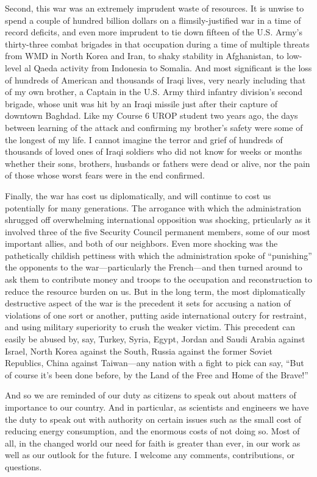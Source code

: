 \documentclass{report}
\begin{document}
Second, this war was an extremely imprudent waste of resources.  It is unwise
to spend a couple of hundred billion dollars on a flimsily-justified war in a
time of record deficits, and even more imprudent to tie down fifteen of the
U.S. Army's thirty-three combat brigades in that occupation during a time of
multiple threats from WMD in North Korea and Iran, to shaky stability in
Afghanistan, to low-level al Qaeda activity from Indonesia to Somalia.  And
most significant is the loss of hundreds of American and thousands of Iraqi
lives, very nearly including that of my own brother, a Captain in the U.S.
Army third infantry division's second brigade, whose unit was hit by an Iraqi
missile just after their capture of downtown Baghdad.  Like my Course 6 UROP
student two years ago, the days between learning of the attack and confirming
my brother's safety were some of the longest of my life.  I cannot imagine the
terror and grief of hundreds of thousands of loved ones of Iraqi soldiers who
did not know for weeks or months whether their sons, brothers, husbands or
fathers were dead or alive, nor the pain of those whose worst fears were in the
end confirmed.

Finally, the war has cost us diplomatically, and will continue to cost us
potentially for many generations.  The arrogance with which the administration
shrugged off overwhelming international opposition was shocking, prticularly as
it involved three of the five Security Council permanent members, some of our
most important allies, and both of our neighbors.  Even more shocking was the
pathetically childish pettiness with which the administration spoke of
``punishing'' the opponents to the war---particularly the French---and then
turned around to ask them to contribute money and troops to the occupation and
reconstruction to reduce the resource burden on us.  But in the long term, the
most diplomatically destructive aspect of the war is the precedent it sets for
accusing a nation of violations of one sort or another, putting aside
international outcry for restraint, and using military superiority to crush the
weaker victim.  This precedent can easily be abused by, say, Turkey, Syria,
Egypt, Jordan and Saudi Arabia against Israel, North Korea against the South,
Russia against the former Soviet Republics, China against Taiwan---any nation
with a fight to pick can say, ``But of course it's been done before, by the
Land of the Free and Home of the Brave!''

And so we are reminded of our duty as citizens to speak out about matters of
importance to our country.  And in particular, as scientists and engineers we
have the duty to speak out with authority on certain issues such as the small
cost of reducing energy consumption, and the enormous costs of not doing so.
Most of all, in the changed world our need for faith is greater than ever, in
our work as well as our outlook for the future.  I welcome any comments,
contributions, or questions.
\end{document}
